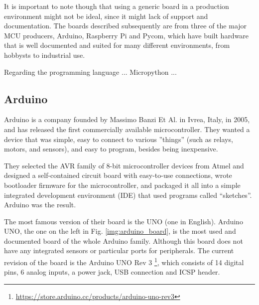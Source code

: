 	It is important to note though that using a generic board in a production environment might not be ideal, since it might lack of support and documentation.
	The boards described subsequently are from three of the major MCU producers, Arduino, Raspberry Pi and Pycom, which have built hardware that is well documented and suited for many different environments, from hobbysts to industrial use.
	
	Regarding the programming language ... Micropython ... 

	\subsection{Arduino}
	
		Arduino is a company founded by Massimo Banzi Et Al. in Ivrea, Italy, in 2005, and has released the first commercially available microcontroller.
		They wanted a device that was simple, easy to connect to various ''things'' (such as relays, motors, and sensors), and easy to program, besides being inexpensive.
	
		They selected the AVR family of 8-bit microcontroller devices from Atmel and designed a self-contained circuit board with easy-to-use connections, wrote bootloader firmware for the microcontroller, and packaged it all into a simple integrated development environment (IDE) that used programs called “sketches”. 
		Arduino was the result.
		
		The most famous version of their board is the UNO (one in English).
		Arduino UNO, the one on the left in Fig. \ref{img:arduino_board}, is the most used and documented board of the whole Arduino family.
		Although this board does not have any integrated sensors or particular ports for peripherals.
		The current revision of the board is the Arduino UNO Rev 3 \footnote{\url{https://store.arduino.cc/products/arduino-uno-rev3}}, which consists of 14 digital pins, 6 analog inputs, a power jack, USB connection and ICSP header.
		
